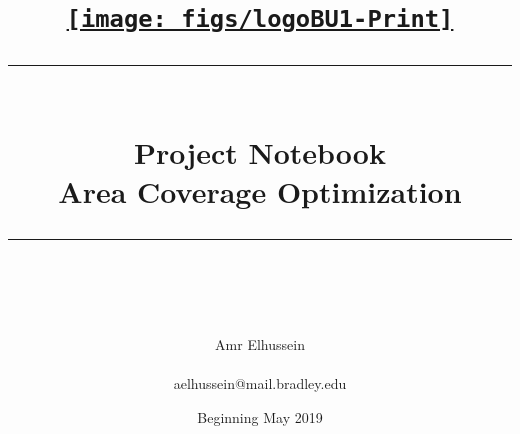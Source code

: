 \documentclass[fontsize=11pt, %
                             paper=letter, %
                             twoside, %
                             captions=tableheading,
                             index=totoc,
                             hyperref]{labbook}
\newcommand{\HRule}{\rule{\linewidth}{0.5mm}} %
\begin{document}


%

\title{
\begin{center}
\href{http://www.bradley.edu}{\texttt{[image: figs/logoBU1-Print]}}
\vskip10pt
\HRule \\[0.4cm]
{\Huge \bfseries Project Notebook \\[0.5cm] \Large Area Coverage Optimization}\\[0.4cm] %
\HRule \\[1.5cm]
\end{center}
}
\author{\Huge Amr Elhussein \\ \\ \LARGE aelhussein@mail.bradley.edu \\[2cm]} %
\date{Beginning May 2019} %
\maketitle


\printindex
\tableofcontents %
\newpage %
\end{document}
